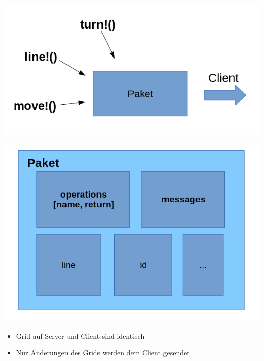 \begin{frame}
	\begin{center}
		\includegraphics[scale=0.5]{simulation/Pakete.jpg}
	\end{center}
\end{frame}


\begin{frame}
	\begin{center}
		\includegraphics[scale=0.5]{simulation/Pakete2.jpg}
	\end{center}
\end{frame}


\begin{frame}
	\begin{itemize}
		\item Grid auf Server und Client sind identisch
		\item Nur Änderungen des Grids werden dem Client gesendet
	\end{itemize}
\end{frame}